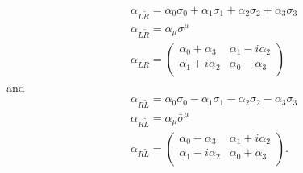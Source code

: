 \documentclass[12pt]{article}
\begin{document}
\begin{equation}
\begin{split}
&\alpha_{L\tilde{R}} = \alpha_0 \sigma_0 + \alpha_1 \sigma_1 + \alpha_2 \sigma_2 + \alpha_3 \sigma_3 \\
&\alpha_{L\tilde{R}} = \alpha_\mu \sigma^\mu \\
&\alpha_{L\tilde{R}} = 
\begin{pmatrix}
\alpha_0 + \alpha_3 & \alpha_1 - i\alpha_2 \\
\alpha_1 + i\alpha_2 & \alpha_0 - \alpha_3 \\
\end{pmatrix}
\end{split}
\end{equation}
and
\begin{equation}
\begin{split}
&\alpha_{R\tilde{L}} = \alpha_0 \sigma_0 - \alpha_1 \sigma_1 - \alpha_2 \sigma_2 - \alpha_3 \sigma_3 \\
&\alpha_{R\tilde{L}} = \alpha_\mu \bar{\sigma}^\mu \\
&\alpha_{R\tilde{L}} = 
\begin{pmatrix}
\alpha_0 - \alpha_3 & \alpha_1 + i\alpha_2 \\
\alpha_1 - i\alpha_2 & \alpha_0 + \alpha_3 \\
\end{pmatrix}.
\end{split}
\end{equation}
\end{document}

